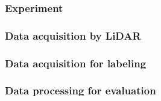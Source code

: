 \subsubsection{Experiment}
\label{sec:train-experiment}


\subsubsection{Data acquisition by LiDAR}
\label{sec:train-lidar-data-acquisition}


\subsubsection{Data acquisition for labeling}
\label{sec:train-labeling}


\subsubsection{Data processing for evaluation}
\label{sec:train-evaluation}
